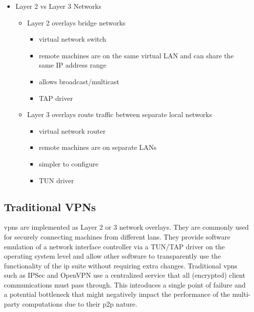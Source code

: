 \begin{itemize}
\tightlist
\item
  Layer 2 vs Layer 3 Networks

  \begin{itemize}
  \tightlist
  \item
    Layer 2 overlays bridge networks

    \begin{itemize}
    \tightlist
    \item
      virtual network switch
    \item
      remote machines are on the same virtual LAN and can share the same
      IP address range
    \item
      allows broadcast/multicast
    \item
      TAP driver
    \end{itemize}
  \item
    Layer 3 overlays route traffic between separate local networks

    \begin{itemize}
    \tightlist
    \item
      virtual network router
    \item
      remote machines are on separate LANs
    \item
      simpler to configure
    \item
      TUN driver
    \end{itemize}
  \end{itemize}
\end{itemize}

\hypertarget{traditional-vpns}{%
\subsection{Traditional VPNs}\label{traditional-vpns}}


\glspl{vpn} are implemented as Layer 2 or 3 network overlays. They are
commonly used for securely connecting machines from different
\glspl{lan}. They provide software emulation of a network interface
controller via a TUN/TAP driver on the operating system level and allow
other software to transparently use the functionality of the \gls{ip}
suite without requiring extra changes. Traditional \glspl{vpn} such as
IPSec \autocite{ipSecDocs} and OpenVPN \autocite{openVPNDocs} use a
centralized service that all (encrypted) client communications must pass
through. This introduces a single point of failure and a potential
bottleneck that might negatively impact the performance of the
multi-party computations due to their \gls{p2p} nature.

